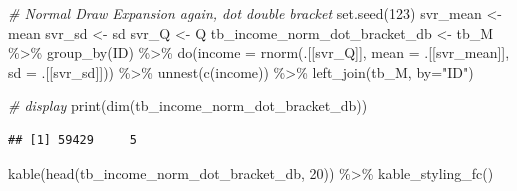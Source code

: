 \documentclass[
]{book}
\newenvironment{Shaded}{\begin{snugshade}}{\end{snugshade}}
\newcommand{\AttributeTok}[1]{\textcolor[rgb]{0.77,0.63,0.00}{#1}}
\newcommand{\CommentTok}[1]{\textcolor[rgb]{0.56,0.35,0.01}{\textit{#1}}}
\newcommand{\DecValTok}[1]{\textcolor[rgb]{0.00,0.00,0.81}{#1}}
\newcommand{\FunctionTok}[1]{\textcolor[rgb]{0.00,0.00,0.00}{#1}}
\newcommand{\NormalTok}[1]{#1}
\newcommand{\OtherTok}[1]{\textcolor[rgb]{0.56,0.35,0.01}{#1}}
\newcommand{\SpecialCharTok}[1]{\textcolor[rgb]{0.00,0.00,0.00}{#1}}
\newcommand{\StringTok}[1]{\textcolor[rgb]{0.31,0.60,0.02}{#1}}
\begin{document}
\begin{Shaded}
\begin{Highlighting}[]
\CommentTok{\# Normal Draw Expansion again, dot double bracket}
\FunctionTok{set.seed}\NormalTok{(}\StringTok{\textquotesingle{}123\textquotesingle{}}\NormalTok{)}
\NormalTok{svr\_mean }\OtherTok{\textless{}{-}} \StringTok{\textquotesingle{}mean\textquotesingle{}}
\NormalTok{svr\_sd }\OtherTok{\textless{}{-}} \StringTok{\textquotesingle{}sd\textquotesingle{}}
\NormalTok{svr\_Q }\OtherTok{\textless{}{-}} \StringTok{\textquotesingle{}Q\textquotesingle{}}
\NormalTok{tb\_income\_norm\_dot\_bracket\_db }\OtherTok{\textless{}{-}}\NormalTok{ tb\_M }\SpecialCharTok{\%\textgreater{}\%} \FunctionTok{group\_by}\NormalTok{(ID) }\SpecialCharTok{\%\textgreater{}\%}
  \FunctionTok{do}\NormalTok{(}\AttributeTok{income =} \FunctionTok{rnorm}\NormalTok{(.[[svr\_Q]],}
                    \AttributeTok{mean =}\NormalTok{ .[[svr\_mean]],}
                    \AttributeTok{sd =}\NormalTok{ .[[svr\_sd]])) }\SpecialCharTok{\%\textgreater{}\%}
  \FunctionTok{unnest}\NormalTok{(}\FunctionTok{c}\NormalTok{(income)) }\SpecialCharTok{\%\textgreater{}\%}
  \FunctionTok{left\_join}\NormalTok{(tb\_M, }\AttributeTok{by=}\StringTok{"ID"}\NormalTok{)}

\CommentTok{\# display}
\FunctionTok{print}\NormalTok{(}\FunctionTok{dim}\NormalTok{(tb\_income\_norm\_dot\_bracket\_db))}
\end{Highlighting}
\end{Shaded}

\begin{verbatim}
## [1] 59429     5
\end{verbatim}

\begin{Shaded}
\begin{Highlighting}[]
\FunctionTok{kable}\NormalTok{(}\FunctionTok{head}\NormalTok{(tb\_income\_norm\_dot\_bracket\_db, }\DecValTok{20}\NormalTok{)) }\SpecialCharTok{\%\textgreater{}\%} \FunctionTok{kable\_styling\_fc}\NormalTok{()}
\end{Highlighting}
\end{Shaded}
\end{document}
